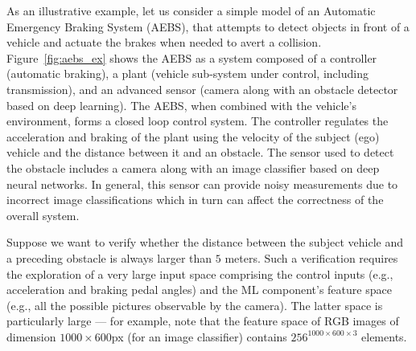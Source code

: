 \begin{example}\label{ex:aebs}

As an illustrative example, let us consider a simple model of an Automatic Emergency Braking System (AEBS),
that attempts to detect objects in front of a vehicle and actuate
the brakes when needed to avert a collision.
Figure~\ref{fig:aebs_ex} shows the AEBS as a system
composed of a controller (automatic braking), a plant (vehicle sub-system under control, including transmission), and an advanced sensor (camera along
with an obstacle detector based on deep learning). The AEBS, when combined
with the vehicle's environment, forms a closed loop control system.
The controller regulates the acceleration and braking of the plant using the velocity of
the subject (ego) vehicle and the distance between it and an obstacle.
The sensor used to detect the obstacle includes a camera along with an image classifier based on deep neural networks.
In general, this sensor can provide noisy measurements due to incorrect image 
classifications which in turn can affect the correctness of the overall system.

Suppose we want to verify 
whether the distance between the subject vehicle and a preceding obstacle is always larger than
$5$ meters. Such a verification requires the exploration of a very 
large input space comprising 
the control inputs (e.g., acceleration and braking pedal angles) and the ML component's feature space
(e.g., all the possible pictures observable by the camera). 
The latter space is particularly large --- for example,
note that the feature space of RGB images of dimension 
$1000\times600$px (for an image classifier) 
contains $256^{1000\times 600 \times 3}$ elements.
\end{example}

